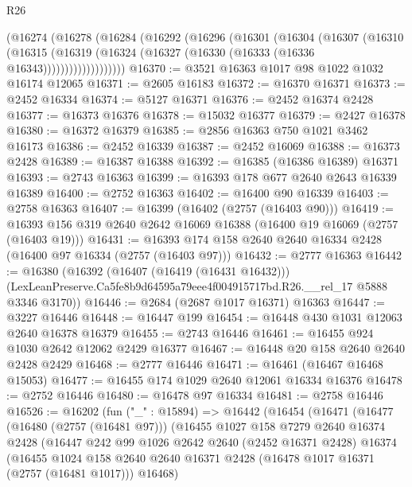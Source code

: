 \begin{lexlean}{R26}
\begin{coremodule}
          (@16274
            (@16278
              (@16284
                (@16292
                  (@16296
                    (@16301
                      (@16304
                        (@16307
                          (@16310
                            (@16315
                              (@16319
                                (@16324 (@16327 (@16330 (@16333 (@16336 @16343)))))))))))))))))))
@16370 := @3521 @16363 @1017 @98 @1022 @1032 @16174 @12065
@16371 := @2605 @16183
@16372 := @16370 @16371
@16373 := @2452 @16334
@16374 := @5127 @16371
@16376 := @2452 @16374 @2428
@16377 := @16373 @16376
@16378 := @15032 @16377
@16379 := @2427 @16378
@16380 := @16372 @16379
@16385 := @2856 @16363 @750 @1021 @3462 @16173
@16386 := @2452 @16339
@16387 := @2452 @16069
@16388 := @16373 @2428
@16389 := @16387 @16388
@16392 := @16385 (@16386 @16389) @16371
@16393 := @2743 @16363
@16399 := @16393 @178 @677 @2640 @2643 @16339 @16389
@16400 := @2752 @16363
@16402 := @16400 @90 @16339
@16403 := @2758 @16363
@16407 := @16399 (@16402 (@2757 (@16403 @90)))
@16419 := @16393 @156 @319 @2640 @2642 @16069 @16388 (@16400 @19 @16069 (@2757 (@16403 @19)))
@16431 := @16393 @174 @158 @2640 @2640 @16334 @2428 (@16400 @97 @16334 (@2757 (@16403 @97)))
@16432 := @2777 @16363
@16442 := @16380
    (@16392
      (@16407 (@16419 (@16431 @16432)))
      (LexLeanPreserve.Ca5fe8b9d64595a79eee4f004915717bd.R26.__rel_17 @5888 @3346 @3170))
@16446 := @2684 (@2687 @1017 @16371) @16363
@16447 := @3227 @16446
@16448 := @16447 @199
@16454 := @16448 @430 @1031 @12063 @2640 @16378 @16379
@16455 := @2743 @16446
@16461 := @16455 @924 @1030 @2642 @12062 @2429 @16377
@16467 := @16448 @20 @158 @2640 @2640 @2428 @2429
@16468 := @2777 @16446
@16471 := @16461 (@16467 @16468 @15053)
@16477 := @16455 @174 @1029 @2640 @12061 @16334 @16376
@16478 := @2752 @16446
@16480 := @16478 @97 @16334
@16481 := @2758 @16446
@16526 := @16202
    (fun ("_" : @15894) =>
    @16442
      (@16454
        (@16471
          (@16477
            (@16480 (@2757 (@16481 @97)))
            (@16455
              @1027
              @158
              @7279
              @2640
              @16374
              @2428
              (@16447
                @242
                @99
                @1026
                @2642
                @2640
                (@2452 @16371 @2428)
                @16374
                (@16455
                  @1024
                  @158
                  @2640
                  @2640
                  @16371
                  @2428
                  (@16478 @1017 @16371 (@2757 (@16481 @1017)))
                  @16468)

\end{coremodule}
\end{lexlean}
